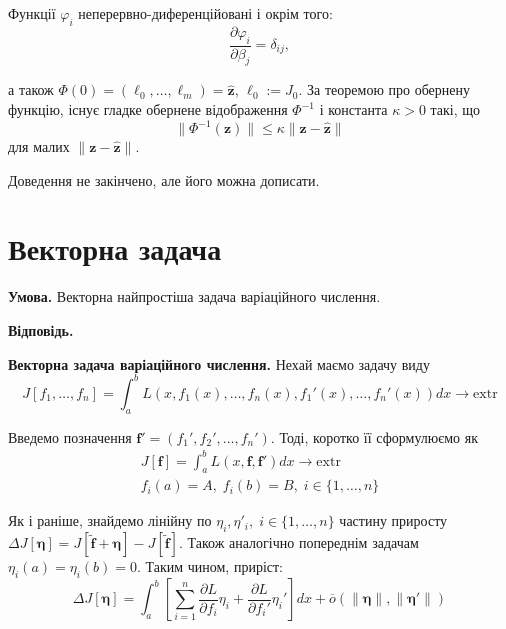 \documentclass[14pt]{extarticle}
\newcommand{\<}{\langle}
\renewcommand{\>}{\rangle}
\theoremstyle{mystyle}{\newtheorem{definition}{Definition}[section]}
\theoremstyle{mystyle}{\newtheorem{proposition}[definition]{Proposition}}
\theoremstyle{mystyle}{\newtheorem{theorem}[definition]{Theorem}}
\theoremstyle{mystyle}{\newtheorem{lemma}[definition]{Lemma}}
\theoremstyle{mystyle}{\newtheorem{corollary}[definition]{Corollary}}
\theoremstyle{mystyle}{\newtheorem*{remark}{Remark}}
\theoremstyle{mystyle}{\newtheorem*{remarks}{Remarks}}
\theoremstyle{mystyle}{\newtheorem*{example}{Example}}
\theoremstyle{mystyle}{\newtheorem*{examples}{Examples}}
\theoremstyle{definition}{\newtheorem*{exercise}{Exercise}}
\theoremstyle{cstyle}{\newtheorem*{cthm}{}}
\theoremstyle{warn}
\begin{document}
Функції $\varphi_i$ неперервно-диференційовані і окрім того:
\begin{equation}
    \frac{\partial \varphi_i}{\partial \beta_j} = \delta_{ij},
\end{equation}

а також $\Phi(0)=(\ell_0,\dots,\ell_m) = \hat{\mathbf{z}}$, $\ell_0:=J_0$. За теоремою про обернену функцію, існує 
гладке обернене відображення $\Phi^{-1}$ і константа $\kappa>0$ такі, що
\begin{equation}
    \|\Phi^{-1}(\mathbf{z})\| \leq \kappa \|\mathbf{z} - \hat{\mathbf{z}}\|
\end{equation}
для малих $\|\mathbf{z} - \hat{\mathbf{z}}\|$.

\begin{center}
    Доведення не закінчено, але його можна дописати.
\end{center}

\pagebreak

\section{Векторна задача}

\textbf{Умова.} Векторна найпростіша задача варіаційного числення.

\textbf{Відповідь.}  

\textbf{Векторна задача варіаційного числення.} Нехай маємо задачу виду
\begin{equation}
    J[f_1,\dots,f_n] = \int_a^b L(x,f_1(x),\dots,f_n(x),f_1'(x),\dots, f_n'(x))dx \to \text{extr}
\end{equation}

Введемо позначення $\mathbf{f}'=(f_1',f_2',\dots,f_n')$. Тоді, коротко її сформулюємо як
\begin{gather}
    J[\mathbf{f}] = \int_a^b L(x,\mathbf{f},\mathbf{f}')dx \to \text{extr} \\
    f_i(a) = A, \; f_i(b) = B, \; i \in \{1,\dots,n\}
\end{gather}

Як і раніше, знайдемо лінійну по $\eta_i,\eta'_i, \; i \in \{1,\dots,n\}$ частину приросту $\Delta J[\boldsymbol{\eta}] = J[\widetilde{\mathbf{f}}+\boldsymbol{\eta}]-J[\widetilde{\mathbf{f}}]$.
Також аналогічно попереднім задачам $\eta_i(a)=\eta_i(b)=0$. Таким чином, приріст:
\begin{equation}
    \Delta J[\boldsymbol{\eta}] = \int_a^b \left[\sum_{i=1}^n \frac{\partial L}{\partial f_i}\eta_i + \frac{\partial L}{\partial f_i'}\eta_i'\right]dx + \overline{o}(\|\boldsymbol{\eta}\|,\|\boldsymbol{\eta}'\|)
\end{equation}
\end{document}
